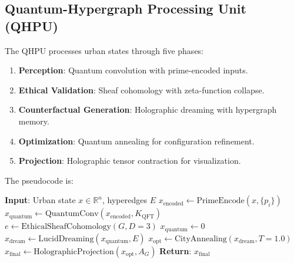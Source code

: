 \documentclass[11pt, a4paper]{article}
\theoremstyle{plain}
\newcommand{\LambdaM}{\Lambda_m}
\newcommand{\Zeta}{\zeta}
\begin{document}
{\subsection{Quantum-Hypergraph Processing Unit (QHPU)}
The QHPU processes urban states through five phases:
\begin{enumerate}
    \item \textbf{Perception}: Quantum convolution with prime-encoded inputs.
    \item \textbf{Ethical Validation}: Sheaf cohomology with zeta-function collapse.
    \item \textbf{Counterfactual Generation}: Holographic dreaming with hypergraph memory.
    \item \textbf{Optimization}: Quantum annealing for configuration refinement.
    \item \textbf{Projection}: Holographic tensor contraction for visualization.
\end{enumerate}
The pseudocode is:
\begin{algorithm}
\caption{QHPU Processing Pipeline}
\begin{algorithmic}[1]
\State \textbf{Input}: Urban state \(x \in \mathbb{R}^n\), hyperedges \(E\)
\State \(x_{\text{encoded}} \gets \text{PrimeEncode}(x, \{p_i\})\)
\State \(x_{\text{quantum}} \gets \text{QuantumConv}(x_{\text{encoded}}, K_{\text{QFT}})\)
\State \(e \gets \text{EthicalSheafCohomology}(G, D=3)\)
\If{\( \Zeta(e, 2) < 1/\LambdaM \)}
    \State \(x_{\text{quantum}} \gets 0\) 
\EndIf
\State \(x_{\text{dream}} \gets \text{LucidDreaming}(x_{\text{quantum}}, E)\)
\State \(x_{\text{opt}} \gets \text{CityAnnealing}(x_{\text{dream}}, T=1.0)\)
\State \(x_{\text{final}} \gets \text{HolographicProjection}(x_{\text{opt}}, A_G)\)
\State \textbf{Return}: \(x_{\text{final}}\)
\end{algorithmic}
\end{algorithm}

}
\end{document}
